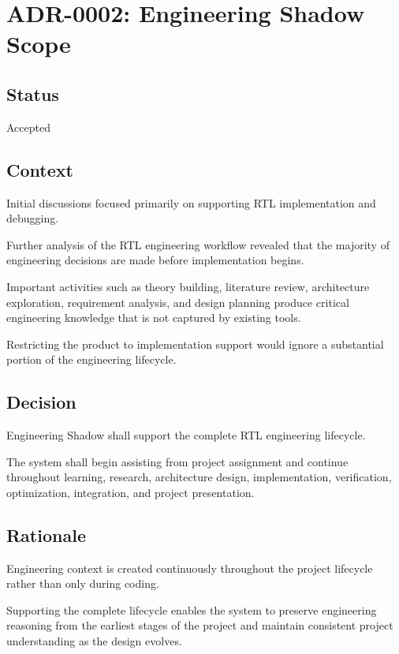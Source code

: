 \section{ADR-0002: Engineering Shadow Scope}

\subsection*{Status}

Accepted

\subsection*{Context}

Initial discussions focused primarily on supporting RTL implementation and debugging.

Further analysis of the RTL engineering workflow revealed that the majority of engineering decisions are made before implementation begins.

Important activities such as theory building, literature review, architecture exploration, requirement analysis, and design planning produce critical engineering knowledge that is not captured by existing tools.

Restricting the product to implementation support would ignore a substantial portion of the engineering lifecycle.

\subsection*{Decision}

Engineering Shadow shall support the complete RTL engineering lifecycle.

The system shall begin assisting from project assignment and continue throughout learning, research, architecture design, implementation, verification, optimization, integration, and project presentation.

\subsection*{Rationale}

Engineering context is created continuously throughout the project lifecycle rather than only during coding.

Supporting the complete lifecycle enables the system to preserve engineering reasoning from the earliest stages of the project and maintain consistent project understanding as the design evolves.

